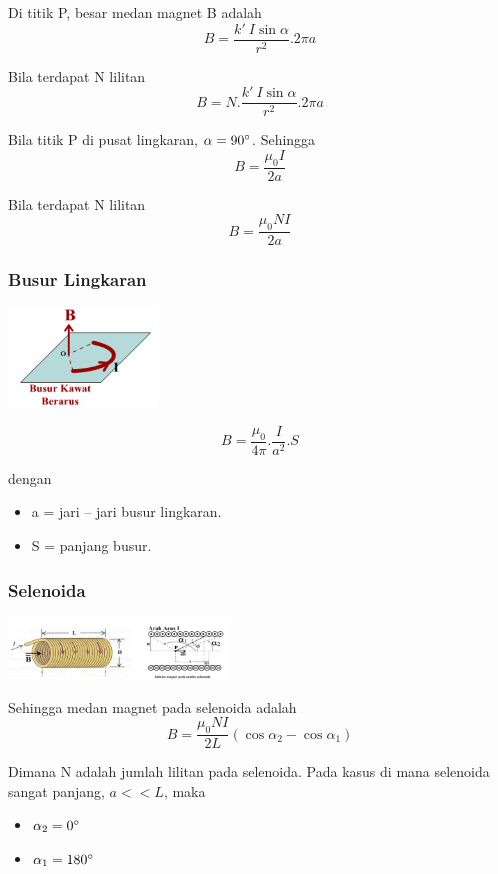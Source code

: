 \documentclass[twocolumn, 11pt]{article}%
\begin{document}
Di titik P, besar medan magnet B adalah
\[B=\frac{k'\ I \sin \alpha}{r^2}. 2\pi a \]

Bila terdapat N lilitan
\[B=N.\frac{k'\ I \sin \alpha}{r^2}. 2\pi a \]

Bila titik P di pusat lingkaran, $\alpha = 90\degree$. Sehingga
\[B=\frac{\mu_0 I}{2a} \]

Bila terdapat N lilitan
\[B=\frac{\mu_0 NI}{2a} \]

\subsubsection{Busur Lingkaran}%
\begin{center}
    \includegraphics[width=150px]{8.png}
\end{center}

\[B=\frac{\mu_0}{4\pi}.\frac{I}{a^2}.S \]

dengan
\begin{itemize}
    \item a = jari – jari busur lingkaran.
    \item S = panjang busur.
\end{itemize}

\subsubsection{Selenoida}%
\begin{center}
    \includegraphics[width=220px]{9.png}
\end{center}

Sehingga medan magnet pada selenoida adalah
\[B=\frac{\mu_0 NI}{2L}(\cos \alpha_2 - \cos \alpha_1) \]

Dimana N adalah jumlah lilitan pada selenoida. Pada kasus di mana
selenoida sangat panjang, $a<<L$, maka
\begin{itemize}
    \item $\alpha_2 = 0\degree$
    \item $\alpha_1 = 180\degree$
\end{itemize}
\end{document}
